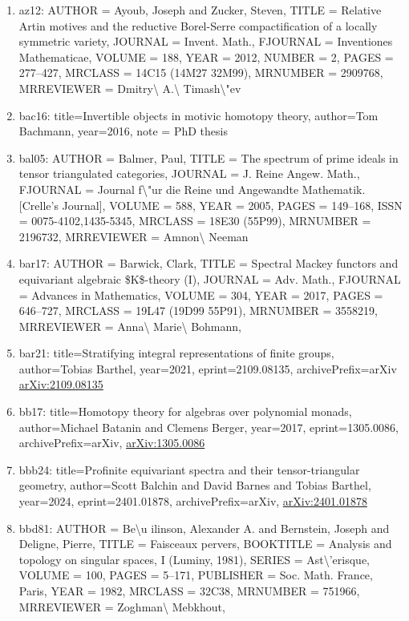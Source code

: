 \documentclass[11pt]{article}
\begin{document}
\begin{enumerate}[leftmargin=*]
  \item az12: AUTHOR = Ayoub, Joseph and Zucker, Steven, TITLE = Relative Artin motives and the reductive Borel-Serre compactification of a locally symmetric variety, JOURNAL = Invent. Math., FJOURNAL = Inventiones Mathematicae, VOLUME = 188, YEAR = 2012, NUMBER = 2, PAGES = 277--427, MRCLASS = 14C15 (14M27 32M99), MRNUMBER = 2909768, MRREVIEWER = Dmitry\textbackslash{} A.\textbackslash{} Timash\textbackslash{}"ev
  \item bac16: title=Invertible objects in motivic homotopy theory, author=Tom Bachmann, year=2016, note = PhD thesis
  \item bal05: AUTHOR = Balmer, Paul, TITLE = The spectrum of prime ideals in tensor triangulated categories, JOURNAL = J. Reine Angew. Math., FJOURNAL = Journal f\textbackslash{}"ur die Reine und Angewandte Mathematik. [Crelle's Journal], VOLUME = 588, YEAR = 2005, PAGES = 149--168, ISSN = 0075-4102,1435-5345, MRCLASS = 18E30 (55P99), MRNUMBER = 2196732, MRREVIEWER = Amnon\textbackslash{} Neeman
  \item bar17: AUTHOR = Barwick, Clark, TITLE = Spectral Mackey functors and equivariant algebraic \$K\$-theory (I), JOURNAL = Adv. Math., FJOURNAL = Advances in Mathematics, VOLUME = 304, YEAR = 2017, PAGES = 646--727, MRCLASS = 19L47 (19D99 55P91), MRNUMBER = 3558219, MRREVIEWER = Anna\textbackslash{} Marie\textbackslash{} Bohmann,
  \item bar21: title=Stratifying integral representations of finite groups, author=Tobias Barthel, year=2021, eprint=2109.08135, archivePrefix=arXiv \href{https://arxiv.org/abs/2109.08135}{arXiv:2109.08135}
  \item bb17: title=Homotopy theory for algebras over polynomial monads, author=Michael Batanin and Clemens Berger, year=2017, eprint=1305.0086, archivePrefix=arXiv, \href{https://arxiv.org/abs/1305.0086}{arXiv:1305.0086}
  \item bbb24: title=Profinite equivariant spectra and their tensor-triangular geometry, author=Scott Balchin and David Barnes and Tobias Barthel, year=2024, eprint=2401.01878, archivePrefix=arXiv, \href{https://arxiv.org/abs/2401.01878}{arXiv:2401.01878}
  \item bbd81: AUTHOR = Be\textbackslash{}u ilinson, Alexander A. and Bernstein, Joseph and Deligne, Pierre, TITLE = Faisceaux pervers, BOOKTITLE = Analysis and topology on singular spaces, I (Luminy, 1981), SERIES = Ast\textbackslash{}'erisque, VOLUME = 100, PAGES = 5--171, PUBLISHER = Soc. Math. France, Paris, YEAR = 1982, MRCLASS = 32C38, MRNUMBER = 751966, MRREVIEWER = Zoghman\textbackslash{} Mebkhout,

\end{enumerate}
\end{document}
